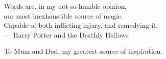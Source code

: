 
\thispagestyle{empty}


\vspace*{3cm}

\begin{center}
Words are, in my not-so-humble opinion, \\
our most inexhaustible source of magic. \\
Capable of both inflicting injury, and remedying it. \\ \medskip
--- Harry Potter and the Deathly Hallows
\end{center}

\medskip

\begin{center}
To Mum and Dad, my greatest source of inspiration.
\end{center}